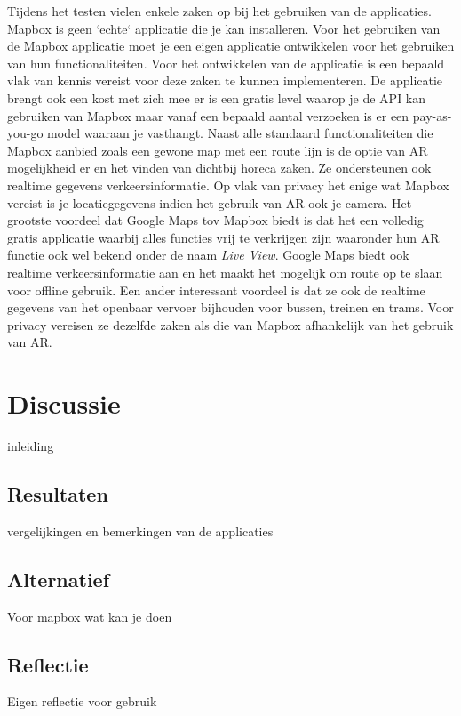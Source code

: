 Tijdens het testen vielen enkele zaken op bij het gebruiken van de applicaties. Mapbox is geen `echte` applicatie die je kan installeren. Voor het gebruiken van de Mapbox applicatie moet je een eigen applicatie ontwikkelen voor het gebruiken van hun functionaliteiten. Voor het ontwikkelen van de applicatie is een bepaald vlak van kennis vereist voor deze zaken te kunnen implementeren. De applicatie brengt ook een kost met zich mee er is een gratis level waarop je de API kan gebruiken van Mapbox maar vanaf een bepaald aantal verzoeken is er een pay-as-you-go model waaraan je vasthangt. Naast alle standaard functionaliteiten die Mapbox aanbied zoals een gewone map met een route lijn is de optie van AR mogelijkheid er en het vinden van dichtbij horeca zaken. Ze ondersteunen ook realtime gegevens verkeersinformatie. Op vlak van privacy het enige wat Mapbox vereist is je locatiegegevens indien het gebruik van AR ook je camera. Het grootste voordeel dat Google Maps tov Mapbox biedt is dat het een volledig gratis applicatie waarbij alles functies vrij te verkrijgen zijn waaronder hun AR functie ook wel bekend onder de naam \textit{Live View}. Google Maps biedt ook realtime verkeersinformatie aan en het maakt het mogelijk om route op te slaan voor offline gebruik. Een ander interessant voordeel is dat ze ook de realtime gegevens van het openbaar vervoer bijhouden voor bussen, treinen en trams. Voor privacy vereisen ze dezelfde zaken als die van Mapbox afhankelijk van het gebruik van AR.

\section{Discussie}
\label{sec:discussie}

inleiding

\subsection{Resultaten}
\label{sec:resultaten}

vergelijkingen en bemerkingen van de applicaties

\subsection{Alternatief}
\label{sec:alternatief}

Voor mapbox wat kan je doen

\subsection{Reflectie}
\label{sec:reflectie}

Eigen reflectie voor gebruik